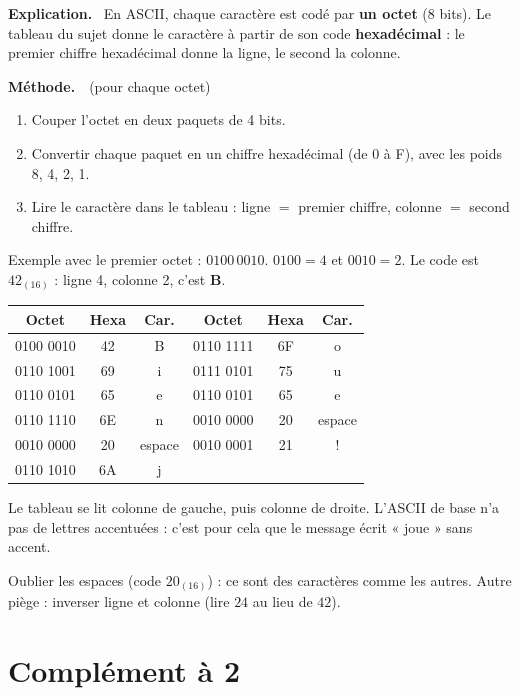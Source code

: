 \documentclass[addpoints, 11pt]{exam}
\newcommand{\methode}{\par\smallskip\noindent\textbf{Méthode.}\ }
\newcommand{\explication}{\par\smallskip\noindent\textbf{Explication.}\ }
\DeclareRobustCommand{\_}{\textunderscore\allowbreak}
\begin{document}
\begin{questions}
\explication
En ASCII, chaque caractère est codé par \textbf{un octet} (8 bits). Le tableau du sujet donne le caractère à partir de son code \textbf{hexadécimal} : le premier chiffre hexadécimal donne la ligne, le second la colonne.

\methode\ (pour chaque octet)
\begin{enumerate}
  \item Couper l'octet en deux paquets de 4 bits.
  \item Convertir chaque paquet en un chiffre hexadécimal (de 0 à F), avec les poids 8, 4, 2, 1.
  \item Lire le caractère dans le tableau : ligne $=$ premier chiffre, colonne $=$ second chiffre.
\end{enumerate}
Exemple avec le premier octet : $0100\,0010$. $0100 = 4$ et $0010 = 2$. Le code est $42_{(16)}$ : ligne 4, colonne 2, c'est \textbf{B}.

\begin{center}
\small
\begin{tabular}{|c|c|c||c|c|c|}
\hline
Octet & Hexa & Car. & Octet & Hexa & Car. \\ \hline
0100 0010 & 42 & B & 0110 1111 & 6F & o \\
0110 1001 & 69 & i & 0111 0101 & 75 & u \\
0110 0101 & 65 & e & 0110 0101 & 65 & e \\
0110 1110 & 6E & n & 0010 0000 & 20 & espace \\
0010 0000 & 20 & espace & 0010 0001 & 21 & ! \\
0110 1010 & 6A & j & & & \\ \hline
\end{tabular}
\end{center}
Le tableau se lit colonne de gauche, puis colonne de droite. L'ASCII de base n'a pas de lettres accentuées : c'est pour cela que le message écrit « joue » sans accent.

\begin{erreur}
Oublier les espaces (code $20_{(16)}$) : ce sont des caractères comme les autres. Autre piège : inverser ligne et colonne (lire $24$ au lieu de $42$).
\end{erreur}

\section{Complément à 2}


\end{questions}
\end{document}
